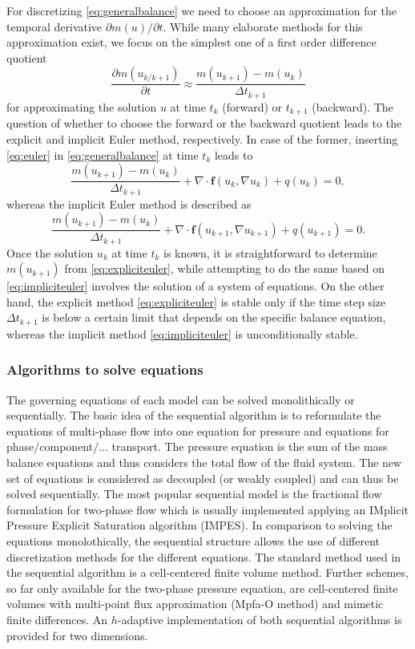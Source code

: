 For discretizing \eqref{eq:generalbalance} we need to choose an
approximation for the temporal derivative $\partial m(u)/\partial t$.
While many elaborate methods for this approximation exist,
we focus on the simplest one of a first order difference quotient
\begin{equation}\label{eq:euler}
\frac{\partial m(u_{k/k+1})}{\partial t}
\approx \frac{m(u_{k+1}) - m(u_k)}{\Delta t_{k+1}}
\end{equation}
for approximating the solution $u$ at time $t_k$ (forward) or $t_{k+1}$ (backward).
The question of whether to choose the forward or the backward quotient leads to the
explicit and implicit Euler method, respectively.
In case of the former, inserting \eqref{eq:euler} in \eqref{eq:generalbalance}
at time $t_k$ leads to
\begin{equation}\label{eq:expliciteuler}
\frac{m(u_{k+1}) - m(u_k)}{\Delta t_{k+1}} + \nabla\cdot\mathbf{f}(u_k, \nabla u_k) + q(u_k) = 0,
\end{equation}
whereas the implicit Euler method is described as
\begin{equation}\label{eq:impliciteuler}
\frac{m(u_{k+1}) - m(u_k)}{\Delta t_{k+1}}
+ \nabla\cdot\mathbf{f}(u_{k+1}, \nabla u_{k+1}) + q(u_{k+1}) = 0.
\end{equation}
Once the solution $u_k$ at time $t_k$ is known, it is straightforward
to determine $m(u_{k+1})$ from \eqref{eq:expliciteuler},
while attempting to do the same based on \eqref{eq:impliciteuler}
involves the solution of a system of equations.
On the other hand, the explicit method \eqref{eq:expliciteuler} is stable only
if the time step size $\Delta t_{k+1}$ is below a certain limit that depends
on the specific balance equation, whereas the implicit method \eqref{eq:impliciteuler}
is unconditionally stable.

\subsubsection{Algorithms to solve equations}
The governing equations of each model can be solved monolithically or sequentially.
The basic idea of the sequential algorithm is to reformulate the
equations of multi-phase flow into one equation for
pressure and equations for phase/component/... transport. The pressure equation
is the sum of the mass balance equations and thus considers the total flow of the
fluid system. The new set of equations is considered as decoupled (or weakly coupled)
and can thus be solved sequentially. The most popular sequential model is the
fractional flow formulation for two-phase flow which is usually implemented applying
an IMplicit Pressure Explicit Saturation algorithm (IMPES).
In comparison to solving the equations monolothically, the sequential structure allows the use of
different discretization methods for the different equations. The standard method
used in the sequential algorithm is a cell-centered finite volume method. Further schemes,
so far only available for the two-phase pressure equation, are cell-centered finite
volumes with multi-point flux approximation (Mpfa-O method) and mimetic finite differences.
An $h$-adaptive implementation of both sequential algorithms is provided for two dimensions.
